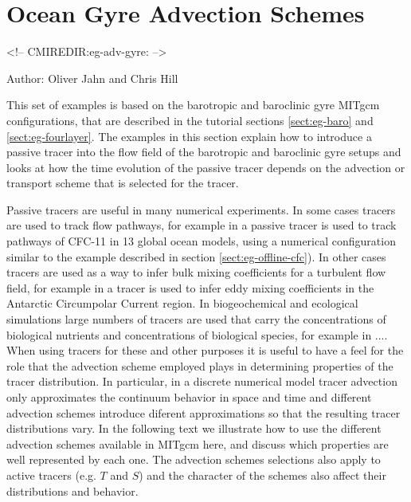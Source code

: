 


\section[Gyre Advection Example]{Ocean Gyre Advection Schemes}
\label{www:tutorials}
\label{sect:eg-adv-gyre}
\begin{rawhtml}
<!-- CMIREDIR:eg-adv-gyre: -->
\end{rawhtml}

Author: Oliver Jahn and Chris Hill



This set of examples is based on the barotropic and baroclinic gyre MITgcm configurations,
that are described in the tutorial sections \ref{sect:eg-baro} and \ref{sect:eg-fourlayer}. 
The examples in this section explain how to introduce a passive tracer into the flow 
field of the barotropic and baroclinic gyre setups and looks at how the time evolution
of the passive tracer depends on the advection or transport scheme that is selected 
for the tracer. 

Passive tracers are useful in many numerical experiments. In some cases tracers are
used to track flow pathways, for example in \cite{Dutay02} a passive tracer is used
to track pathways of CFC-11 in 13 global ocean models, using a numerical
configuration similar to the example described in section \ref{sect:eg-offline-cfc}).
In other cases tracers are used as a way
to infer bulk mixing coefficients for a turbulent flow field, for example in 
\cite{marsh06} a tracer is used to infer eddy mixing coefficients in the
Antarctic Circumpolar Current region. In biogeochemical and ecological simulations large numbers 
of tracers are used that carry the concentrations of biological nutrients and concentrations of 
biological species, for example in ....
When using tracers for these and other purposes it is useful to have a feel for the role
that the advection scheme employed plays in determining properties of the tracer distribution.
In particular, in a discrete numerical model tracer advection only approximates the 
continuum behavior in space and time and different advection schemes introduce diferent 
approximations so that the resulting tracer distributions vary. In the following 
text we illustrate how
to use the different advection schemes available in MITgcm here, and discuss which properties 
are well represented by each one. The advection schemes selections also apply to active
tracers (e.g. $T$ and $S$) and the character of the schemes also affect their distributions
and behavior.

